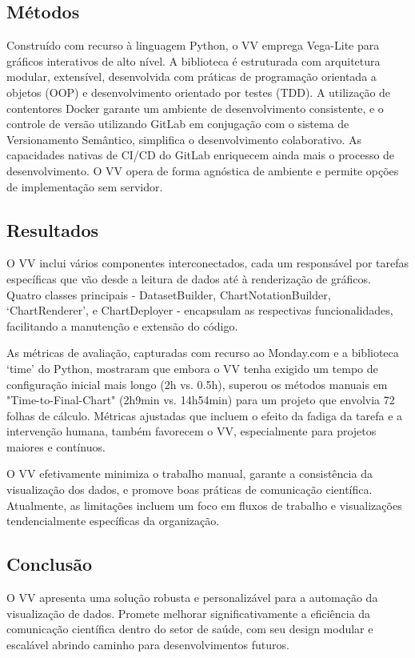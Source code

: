 \subsection*{Métodos}\label{muxe9todos}

Construído com recurso à linguagem Python, o VV emprega Vega-Lite para
gráficos interativos de alto nível. A biblioteca é estruturada com
arquitetura modular, extensível, desenvolvida com práticas de
programação orientada a objetos (OOP) e desenvolvimento orientado por
testes (TDD). A utilização de contentores Docker garante um ambiente de
desenvolvimento consistente, e o controle de versão utilizando GitLab em
conjugação com o sistema de Versionamento Semântico, simplifica o
desenvolvimento colaborativo. As capacidades nativas de CI/CD do GitLab
enriquecem ainda mais o processo de desenvolvimento. O VV opera de forma
agnóstica de ambiente e permite opções de implementação sem servidor.

\subsection*{Resultados}\label{resultados}

O VV inclui vários componentes interconectados, cada um responsável por
tarefas específicas que vão desde a leitura de dados até à renderização
de gráficos. Quatro classes principais -
\textquotesingle DatasetBuilder\textquotesingle,
\textquotesingle ChartNotationBuilder\textquotesingle, `ChartRenderer',
e \textquotesingle ChartDeployer\textquotesingle{} - encapsulam as
respectivas funcionalidades, facilitando a manutenção e extensão do
código.

As métricas de avaliação, capturadas com recurso ao Monday.com e a
biblioteca `time' do Python, mostraram que embora o VV tenha exigido um
tempo de configuração inicial mais longo (2h vs. 0.5h), superou os
métodos manuais em "Time-to-Final-Chart" (2h9min vs. 14h54min) para um
projeto que envolvia 72 folhas de cálculo. Métricas ajustadas que
incluem o efeito da fadiga da tarefa e a intervenção humana, também
favorecem o VV, especialmente para projetos maiores e contínuos.

O VV efetivamente minimiza o trabalho manual, garante a consistência da
visualização dos dados, e promove boas práticas de comunicação
científica. Atualmente, as limitações incluem um foco em fluxos de
trabalho e visualizações tendencialmente específicas da organização.

\subsection*{Conclusão}\label{conclusuxe3o}

O VV apresenta uma solução robusta e personalizável para a automação da
visualização de dados. Promete melhorar significativamente a eficiência
da comunicação científica dentro do setor de saúde, com seu design
modular e escalável abrindo caminho para desenvolvimentos futuros.
